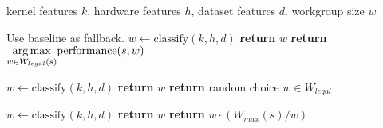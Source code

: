 \begin{algorithmic}[1]
\Require kernel features $k$, hardware features $h$, dataset features
$d$.
\Ensure workgroup size $w$

\Comment Use baseline as fallback.
\State $w \leftarrow \text{classify}(k, h, d)$
    \State \textbf{return} $w$
\Else
  \State \textbf{return} $\underset{w \in W_{legal}(s)}{\operatorname*{arg\,max}} \text{performance}(s,w)$
\EndIf
\EndProcedure
\item[]

\State $w \leftarrow \text{classify}(k, h, d)$
    \State \textbf{return} $w$
\Else
  \State \textbf{return} random choice $w \in W_{legal}$
\EndIf
\EndProcedure
\item[]

\State $w \leftarrow \text{classify}(k, h, d)$
    \State \textbf{return} $w$
\Else
  \State \textbf{return} $w \cdot (W_{max}(s) / w)$
\EndIf
\EndProcedure
\end{algorithmic}
